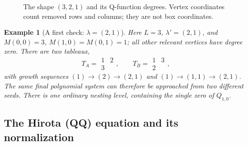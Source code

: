 \documentclass[11pt]{article}
\newtheorem{example}{Example}[section]
\begin{document}
\begin{figure}[htbp]
\centering
{}
\caption{The shape $(3,2,1)$ and its Q-function degrees. Vertex
coordinates count removed rows and columns; they are not box coordinates.}
\label{fig:degree321}
\end{figure}

\begin{example}[A first check: $\lambda=(2,1)$]
\label{ex:shape21}
Here $L=3$, $\lambda'=(2,1)$, and
$M(0,0)=3$, $M(1,0)=M(0,1)=1$; all other relevant vertices have degree
zero. There are two tableaux,
\[
 T_A=\begin{smallmatrix}1&2\\3&\end{smallmatrix},\qquad
 T_B=\begin{smallmatrix}1&3\\2&\end{smallmatrix},
\]
with growth sequences $(1)\to(2)\to(2,1)$ and
$(1)\to(1,1)\to(2,1)$. The same final polynomial system can therefore
be approached from two different seeds. There is one ordinary nesting
level, containing the single zero of $Q_{1,0}$.
\end{example}

\subsection{The Hirota (QQ) equation and its normalization}
\label{sec:hirota}
\end{document}
